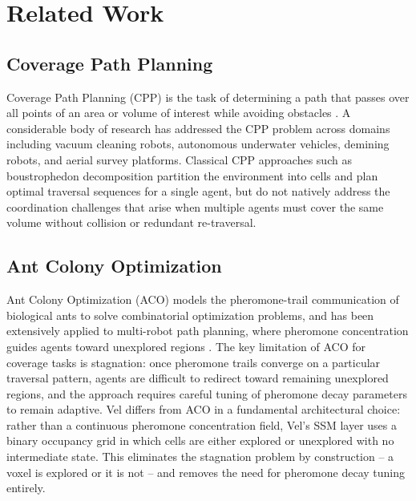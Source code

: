 \documentclass[10pt,journal]{IEEEtran}
\begin{document}
\section{Related Work}
\label{sec:related}

\subsection{Coverage Path Planning}
Coverage Path Planning (CPP) is the task of determining a path that passes
over all points of an area or volume of interest while avoiding obstacles
\cite{yamauchi1997}. A considerable body of research has addressed the CPP
problem across domains including vacuum cleaning robots, autonomous
underwater vehicles, demining robots, and aerial survey platforms. Classical
CPP approaches such as boustrophedon decomposition partition the
environment into cells and plan optimal traversal sequences for a single
agent, but do not natively address the coordination challenges that arise
when multiple agents must cover the same volume without collision or
redundant re-traversal.

\subsection{Ant Colony Optimization}
Ant Colony Optimization (ACO) models the pheromone-trail communication of
biological ants to solve combinatorial optimization problems, and has been
extensively applied to multi-robot path planning, where pheromone
concentration guides agents toward unexplored regions \cite{dorigo2006ant}.
The key limitation of ACO for coverage tasks is stagnation: once pheromone
trails converge on a particular traversal pattern, agents are difficult to
redirect toward remaining unexplored regions, and the approach requires
careful tuning of pheromone decay parameters to remain adaptive. Vel
differs from ACO in a fundamental architectural choice: rather than a
continuous pheromone concentration field, Vel's SSM layer uses a binary
occupancy grid in which cells are either explored or unexplored with no
intermediate state. This eliminates the stagnation problem by construction
-- a voxel is explored or it is not -- and removes the need for pheromone
decay tuning entirely.
\end{document}
